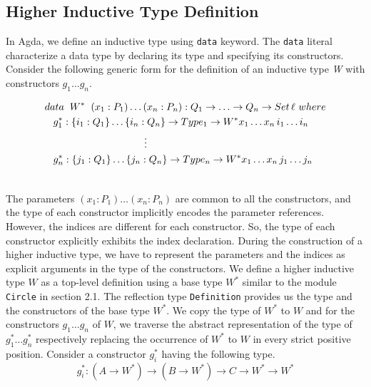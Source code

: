 \documentclass[sigplan,10pt]{acmart}
\begin{document}
\subsection{Higher Inductive Type Definition}
\label{sec:sec4.1}

In Agda, we define an inductive type using {\tt data} keyword. The {\tt data} literal characterize a data type by declaring its type and specifying its constructors. Consider the following generic form for the definition of an inductive type \emph{W} with constructors $g_1 \ldots g_n$.
\begin{center}
\begingroup
\fontsize{7.9pt}{0pt}\selectfont
\begin{align}
& data \hspace{0.2cm} W^* \hspace{0.2cm} (x_1:P_1)\ldots(x_n:P_n) : Q_1 \rightarrow\ldots\rightarrow Q_n \rightarrow Set \, \ell \, \, where \nonumber \\
& \hspace{0.3cm} g_1^* : \{i_1 : Q_1\} \ldots \{i_n : Q_n\} \rightarrow Type_1\rightarrow W^* x_1 \ldots x_n \, i_1 \ldots i_n \nonumber \\
& \hspace{3.5cm} \vdots \nonumber \\
& \hspace{0.3cm} g_n^* : \{j_1 : Q_1\} \ldots \{j_n : Q_n\} \rightarrow Type_n\rightarrow W^* x_1 \dots x_n \, j_1 \ldots j_n \nonumber \\ \nonumber
\end{align}
\endgroup
\end{center}
\normalsize

The parameters $(x_1:P_1)\ldots(x_n:P_n)$ are common to all the constructors, and the type of each constructor implicitly encodes the parameter references. However, the indices are different for each constructor. So, the type of each constructor explicitly exhibits the index declaration. During the construction of a higher inductive type, we have to represent the parameters and the indices as explicit arguments in the type of the constructors. We define a higher inductive type $W$ as a top-level definition using a base type $W^*$ similar to the module {\tt Circle} in section 2.1. The reflection type {\tt Definition} provides us the type and the constructors of the base type $W^*$. We copy the type of $W^*$ to $W$ and for the constructors $g_1 \ldots g_n$ of $W$, we traverse the abstract representation of the type of $g_1^* \ldots g_n^*$ respectively replacing the occurrence of $W^*$ to $W$ in every strict positive position. Consider a constructor $g_i^*$ having the following type.
\begin{equation}
g_i^* : (A \rightarrow W^*) \rightarrow (B \rightarrow W^*) \rightarrow C \rightarrow W^* \rightarrow W^* \nonumber
\end{equation}
\end{document}
